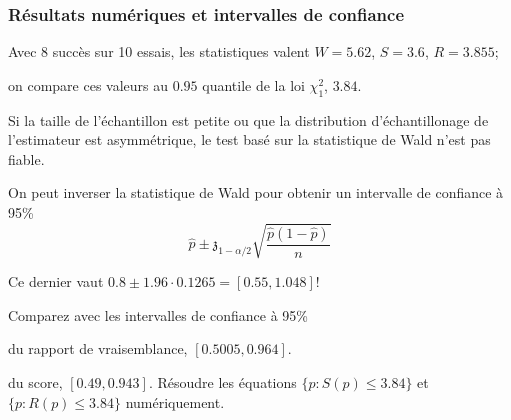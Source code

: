 \documentclass{beamer}
\begin{document}
 \begin{frame}[fragile]
 \frametitle{Résultats numériques et intervalles de confiance}
 \bi 
 \item Avec 8 succès sur 10 essais, les statistiques valent $W=5.62$, $S=3.6$, $R = 3.855$;
 \item on compare ces valeurs au  $0.95$ quantile de la loi $\chi^2_1$, $3.84$.
 \ei
 \bi \item 
Si la taille de l'échantillon est petite ou que la distribution d'échantillonage de l'estimateur est asymmétrique, le test basé sur la statistique de Wald n'est \alert{pas fiable}.
\item 
 On peut inverser la statistique de Wald pour obtenir un intervalle de confiance à 95\% \[\widehat{p} \pm \mathfrak{z}_{1-\alpha/2}\sqrt{\frac{\widehat{p}(1-\widehat{p})}{n}}\]
 \item Ce dernier vaut $0.8 \pm 1.96 \cdot 0.1265 = [0.55, 1.048]$!
 \item Comparez avec les intervalles de confiance à 95\%
 \bi \item du rapport de vraisemblance, $[0.5005, 0.964]$.
 \item du score, $[0.49, 0.943]$.
  \ei 
  \ei 
  {\footnotesize Résoudre les équations $\{p: S(p) \leq 3.84\}$ et $\{p: R(p) \leq 3.84\}$ numériquement.}
\end{frame}
% 
% 
\end{document}
